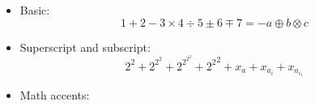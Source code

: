 \documentclass{article}
\def\Latinalphabets{ABCDEFGHIJKLMNOPQRSTUVWXYZ}
\def\latinalphabets{abcdefghijklmnopqrstuvwxyz}
\def\Greekalphabets{%
  \Alpha      \Beta       \Gamma      \Delta      \Epsilon
  \Zeta       \Eta        \Theta      \varTheta   \Iota
  \Kappa      \Lambda     \Mu         \Nu         \Xi
  \Omicron    \Pi         \Rho        \Sigma      \Tau
  \Upsilon    \Phi        \Chi        \Psi        \Omega
}
\def\greekalphabets{%
  \alpha      \beta       \gamma      \delta      \epsilon
  \varepsilon \zeta       \eta        \theta      \vartheta 
  \iota       \kappa      \varkappa   \lambda     \mu
  \nu         \xi         \omicron    \pi         \rho
  \varrho     \sigma      \varsigma   \tau        \upsilon
  \phi        \varphi     \chi        \psi        \omega
}
\begin{document}
\begin{itemize}
  \item Basic:
        \[ 1 + 2 - 3 \times 4 \div 5 \pm 6 \mp 7 = -a \oplus b \otimes c \]

  \item Superscript and subscript:
        \[ 2^2 + 2^{2^2} + 2^{2^{2^2}} + {2^2}^2 + x_a + x_{a_i} + x_{a_{i_1}} \]

  \item Math accents:


\end{itemize}
\end{document}
